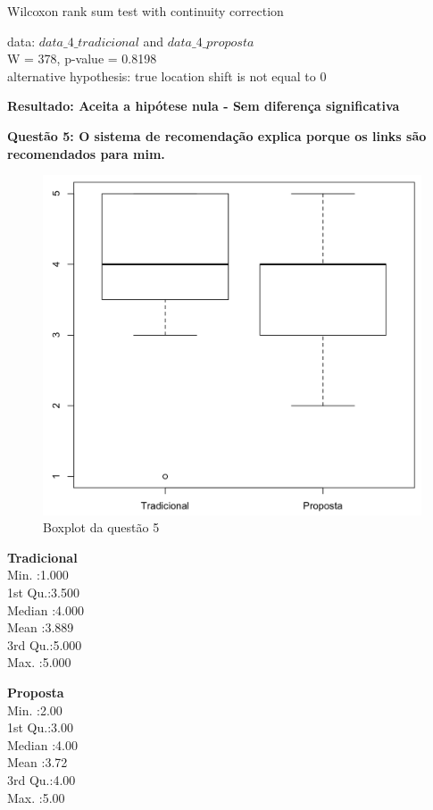 Wilcoxon rank sum test with continuity correction

\noindent
data:  $data\_4\_tradicional$ and $data\_4\_proposta$\\
W = 378, p-value = 0.8198\\
alternative hypothesis: true location shift is not equal to 0

\textbf{Resultado: Aceita a hipótese nula - Sem diferença significativa}

\newpage
\textbf{Questão 5: O sistema de recomendação explica porque os links são recomendados para mim.}

\begin{figure}[htb]
  \caption{\label{fig:questao5-boxplot}Boxplot da questão 5}
  \begin{center}
      \includegraphics[scale=0.4]{./Figuras/questao5-boxplot.png}
  \end{center}
\end{figure}

\begin{multicols}{2}

\noindent\textbf{Tradicional}\\
Min.   :1.000\\
1st Qu.:3.500\\
Median :4.000\\
Mean   :3.889\\
3rd Qu.:5.000\\
Max.   :5.000\\
\columnbreak

\noindent\textbf{Proposta}\\
Min.   :2.00\\
1st Qu.:3.00\\
Median :4.00\\
Mean   :3.72\\
3rd Qu.:4.00\\
Max.   :5.00
\end{multicols}

